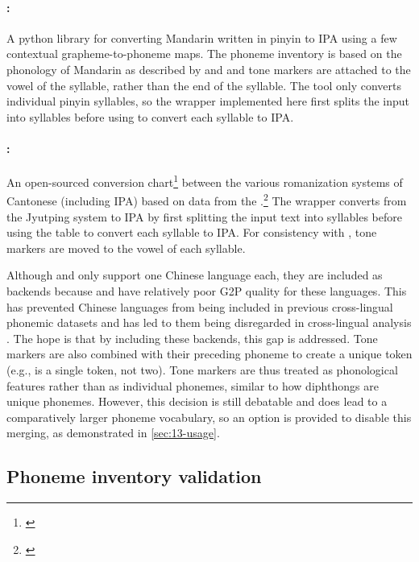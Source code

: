 \paragraph{\pinyin \citep{taubert_2024_pinyin-to-ipa_2024}:} A python library for converting Mandarin written in pinyin to IPA using a few contextual grapheme-to-phoneme maps. The phoneme inventory is based on the phonology of Mandarin as described by \cite{lin2007sounds} and \cite{duanmu2007phonology} and tone markers are attached to the vowel of the syllable, rather than the end of the syllable. The tool only converts individual pinyin syllables, so the wrapper implemented here first splits the input into syllables before using \pinyin to convert each syllable to IPA.

\paragraph{\pingyam :} An open-sourced conversion chart\footnote{\href{https://github.com/kfcd/pingyam}{}} between the various romanization systems of Cantonese (including IPA) based on data from the .\footnote{\href{https://www.kaifangcidian.com/han/yue/}{}} The wrapper converts from the Jyutping system to IPA by first splitting the input text into syllables before using the table to convert each syllable to IPA. For consistency with \pinyin, tone markers are moved to the vowel of each syllable. 

Although \pinyin and \pingyam only support one Chinese language each, they are included as backends because \epitran and \phonemizer have relatively poor G2P quality for these languages. This has prevented Chinese languages from being included in previous cross-lingual phonemic datasets \citep{ahn-chodroff-2022-voxcommunis} and has led to them being disregarded in cross-lingual analysis \citep{pimentel2020phonotactic}. The hope is that by including these backends, this gap is addressed. Tone markers are also combined with their preceding phoneme to create a unique token (e.g.,  is a single token, not two). Tone markers are thus treated as phonological features rather than as individual phonemes, similar to how diphthongs are unique phonemes. However, this decision is still debatable and does lead to a comparatively larger phoneme vocabulary, so an option is provided to disable this merging, as demonstrated in \cref{sec:13-usage}. 

\subsection{Phoneme inventory validation}\label{sec:13-folding}

